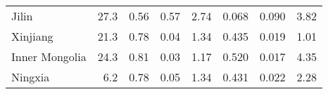 \begin{tabular}{lrrrrrrr}
 Jilin          &       27.3 &  0.56 &  0.57 &                   2.74 &                          0.068 &                              0.090 &        3.82 \\
 Xinjiang       &       21.3 &  0.78 &  0.04 &                   1.34 &                          0.435 &                              0.019 &        1.01 \\
 Inner Mongolia &       24.3 &  0.81 &  0.03 &                   1.17 &                          0.520 &                              0.017 &        4.35 \\
 Ningxia        &        6.2 &  0.78 &  0.05 &                   1.34 &                          0.431 &                              0.022 &        2.28 \\
\hline
\end{tabular}
